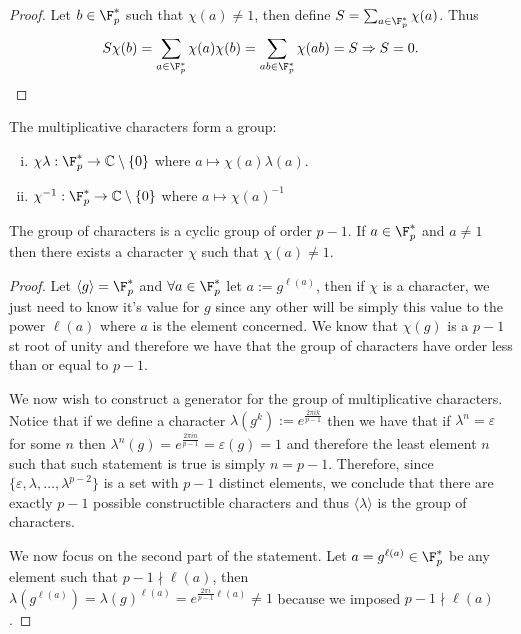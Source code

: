 \begin{proof}
   Let \(b \in \F_p^\ast\) such that \(\chi(a) \neq 1\), then define \(S =
   \sum_{a \in \F_p^\ast} \chi(a)\). Thus
   \[
      S\chi(b) = \sum_{a \in \F_p^\ast} \chi(a)\chi(b) = \sum_{ab \in \F_p^\ast}
      \chi(ab) = S \Rightarrow S = 0.
   \] 
\end{proof}

\begin{proposition}
   The multiplicative characters form a group:
   \begin{enumerate}[i.]
      \item \(\chi\lambda : \F_p^\ast \to \mathbb{C} \setminus \{0\} \) where
         \(a \mapsto \chi(a)\lambda(a)\).
      \item  \(\chi^{-1}: \F_p^\ast \to \mathbb{C} \setminus \{0\} \) where \(a
         \mapsto \chi(a)^{-1}\)
   \end{enumerate}
\end{proposition}

\begin{proposition}
   The group of characters is a cyclic group of order \(p-1\). If \(a \in
   \F_p^\ast\) and \(a \neq 1\) then there exists a character \(\chi\) such
   that \(\chi(a) \neq 1\).
\end{proposition}

\begin{proof}
   Let \(\langle g \rangle = \F_p^\ast\) and \(\forall a \in \F_p^\ast\) let \(a
   := g^{\ell(a)}\), then if \(\chi\) is a character, we just need to know it's
   value for \(g\) since any other will be simply this value to the power
   \(\ell(a)\) where \(a\) is the element concerned. We know that  \(\chi(g)\)
   is a  \(p-1\)st root of unity and therefore we have that the group of
   characters have order less than or equal to \(p-1\).

   We now wish to construct a generator for the group of multiplicative
   characters. Notice that if we define a character  \(\lambda(g^k) :=
   e^{\frac{2\pi i k}{p-1}}\) then we have that if \(\lambda^n = \varepsilon\) for
   some \(n\) then \(\lambda^n(g) = e^{\frac{2\pi i n}{p-1}} = \varepsilon(g) = 1\)
   and therefore the least element \(n\) such that such statement is true is
   simply \(n = p-1\). Therefore, since \(\{\varepsilon,
   \lambda,\dots,\lambda^{p-2}\}\) is a set with \(p-1\) distinct elements, we
   conclude that there are exactly \(p-1\) possible constructible characters and
   thus \(\langle \lambda \rangle \) is the group of characters.

   We now focus on the second part of the statement. Let \(a = g^{\ell(a)} \in
   \F_p^\ast\) be any element such that \(p-1 \nmid \ell(a)\), then
   \(\lambda(g^{\ell(a)}) = \lambda(g)^{\ell(a)} = e^{\frac{2 \pi
   i}{p-1}\ell(a)} \neq 1\) because we imposed \(p-1 \nmid \ell(a)\).
\end{proof}

